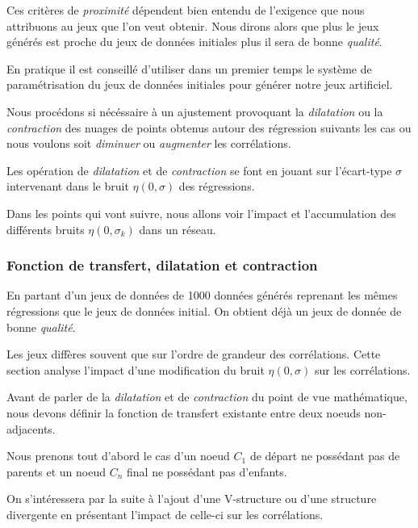 \documentclass[a4paper]{article}
\begin{document}
Ces critères de \textit{proximité} dépendent bien entendu de l'exigence que nous attribuons au jeux que l'on veut obtenir. Nous dirons alors que plus le jeux générés est proche du jeux de données initiales plus il sera de bonne  \textit{qualité}.

En pratique il est conseillé d'utiliser dans un premier temps le système de paramétrisation du jeux de données initiales pour générer notre jeux artificiel.

Nous procédons si nécéssaire à un ajustement provoquant la \textit{dilatation} ou la  \textit{contraction} des nuages de points obtenus autour des régression suivants les cas ou nous voulons soit \textit{diminuer} ou \textit{augmenter} les corrélations.

Les opération de \textit{dilatation} et de \textit{contraction} se font en jouant sur l'écart-type $\sigma$ intervenant dans le bruit $\eta(0,\sigma)$ des régressions.

Dans les points qui vont suivre, nous allons voir l'impact et l'accumulation des différents bruits $\eta(0,\sigma_{k})$ dans un réseau.


\subsubsection{Fonction de transfert, dilatation et contraction}

En partant d'un jeux de données de 1000 données générés reprenant les mêmes régressions que le jeux de données initial.
On obtient déjà un jeux de donnée de bonne \textit{qualité}.

Les jeux diffères souvent que sur l'ordre de grandeur des corrélations. Cette section analyse l'impact d'une modification du bruit $\eta(0,\sigma)$ sur les corrélations.


Avant de parler de la  \textit{dilatation} et de \textit{contraction} du point de vue mathématique, nous devons définir la fonction de transfert existante entre deux noeuds non-adjacents. 

Nous prenons tout d'abord le cas d'un noeud $C_{1}$ de départ ne possédant  pas de parents et un noeud $C_{n}$ final ne possédant pas d'enfants.

On s'intéressera par la suite à l'ajout d'une V-structure ou d'une structure divergente en présentant l'impact de celle-ci sur les corrélations.
\end{document}
